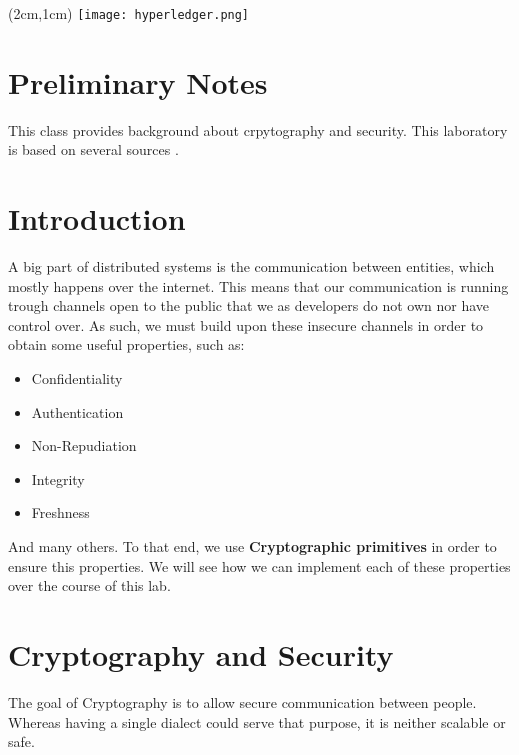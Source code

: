\documentclass[12pt,a4paper]{article}
\theoremstyle{definition}
\begin{document}
\textblockorigin{-34pt}{-12pt}
\begin{textblock*}{10cm}(2cm,1cm)
\texttt{[image: hyperledger.png]}
\end{textblock*}

\section*{Preliminary Notes}
This class provides background about crpytography and security. This laboratory is based on several sources \cite{sdist2017,rogaway2004,md2020}.






\section{Introduction}

A big part of distributed systems is the communication between entities, which mostly happens over the internet. 
This means that our communication is running trough channels open to the public that we as developers do not own nor have control over. 
As such, we must build upon these insecure channels in order to obtain some useful properties, such as:

\begin{itemize}
    \item Confidentiality
    \item Authentication
    \item Non-Repudiation
    \item Integrity
    \item Freshness
\end{itemize}

And many others. To that end, we use \textbf{Cryptographic primitives} in order to ensure this properties. We will see how we can implement each of these properties over the course of this lab.

\section{Cryptography and Security}
The goal of Cryptography is to allow secure communication between people. Whereas having a single dialect could serve that purpose, it is neither scalable or safe.
\end{document}
